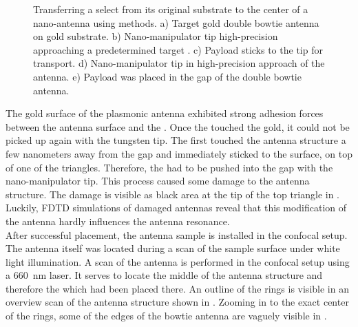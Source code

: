 \begin{figure}[htp]
\begin{subfigure}[t]{ 0.49\linewidth}
					\caption{}
					\label{subfig::pp_payload_delivered}
				\end{subfigure}
				\caption[Pick-and-place coupling of \nd to antenna]{Transferring a select \nd from its original substrate to the center of a nano-antenna using \pp methods. a) Target gold double bowtie antenna on gold substrate. b) Nano-manipulator tip high-precision approaching a predetermined target \nd. c) Payload \nd sticks to the tip for transport. d) Nano-manipulator tip in high-precision approach of the antenna. e) Payload \nd was placed in the gap of the double bowtie antenna.}
				\label{fig::pp_antenna}
			\end{figure}

			The gold surface of the plasmonic antenna exhibited strong adhesion forces between the antenna surface and the \nd.
			Once the \nd touched the gold, it could not be picked up again with the tungsten tip.
			The \nd first touched the antenna structure a few nanometers away from the gap and immediately sticked to the surface, on top of one of the triangles.
			Therefore, the \nd had to be pushed into the gap with the nano-manipulator tip.
			This process caused some damage to the antenna structure.
			The damage is visible as black area at the tip of the top triangle in .
			Luckily, FDTD simulations of damaged antennas reveal that this modification of the antenna hardly influences the antenna resonance.
			\\
			After successful placement, the antenna sample is installed in the confocal setup.
			The antenna itself was located during a scan of the sample surface under white light illumination.
			A scan of the antenna is performed in the confocal setup using a \SI{660}{nm} \cw laser.
			It serves to locate the middle of the antenna structure and therefore the \nd which had been placed there.
			An outline of the rings is visible in an overview scan of the antenna structure shown in .
			Zooming in to the exact center of the rings, some of the edges of the bowtie antenna are vaguely visible in .

